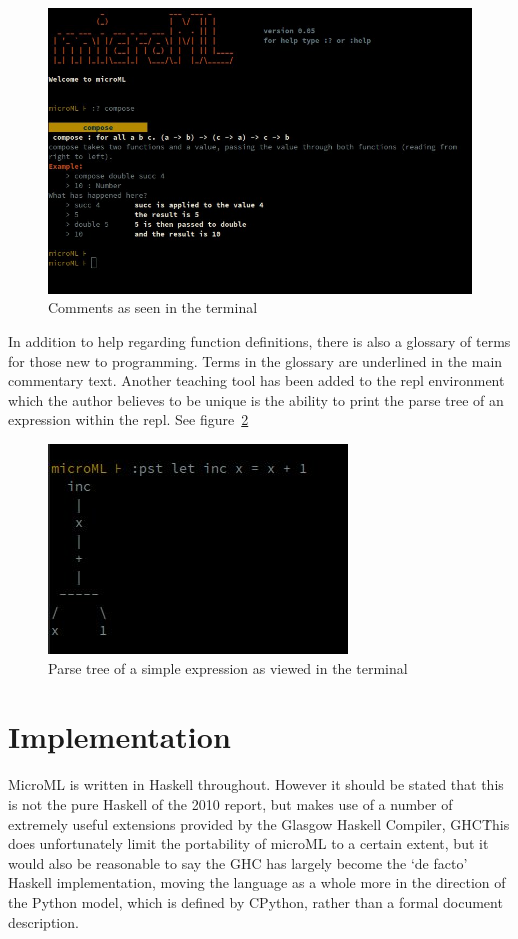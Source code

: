 \documentclass[12pt, a4paper]{report}
\begin{document}
\begin{figure}
    \includegraphics[scale=0.4]{images/comment.jpg}
    {\caption{Comments as seen in the terminal}}
    \label{fig:comments}
\end{figure}

In addition to help regarding function definitions, there is also a glossary of terms for those new
to programming. Terms in the glossary are underlined in the main commentary text.  Another teaching 
tool has been added to the repl environment which the author believes to be unique
is the ability to print the parse tree of an expression within the repl. See figure~\ref{fig:tree}

\begin{figure}
    \includegraphics[scale=0.6]{images/tree.jpg}
    {\caption{Parse tree of a simple expression as viewed in the terminal}}
    \label{fig:tree}
\end{figure}

\section{Implementation}
MicroML is written in Haskell throughout. However it should be stated that this is not the pure
Haskell of the 2010 report, but makes use of a number of extremely useful extensions provided by
the Glasgow Haskell Compiler, GHC\. This does unfortunately limit the portability of microML to a certain extent, 
but it would also be reasonable to say the GHC has largely become the `de facto' Haskell implementation, moving the
language as a whole more in the direction of the Python model, which is defined by CPython, 
rather than a formal document description.
\end{document}
